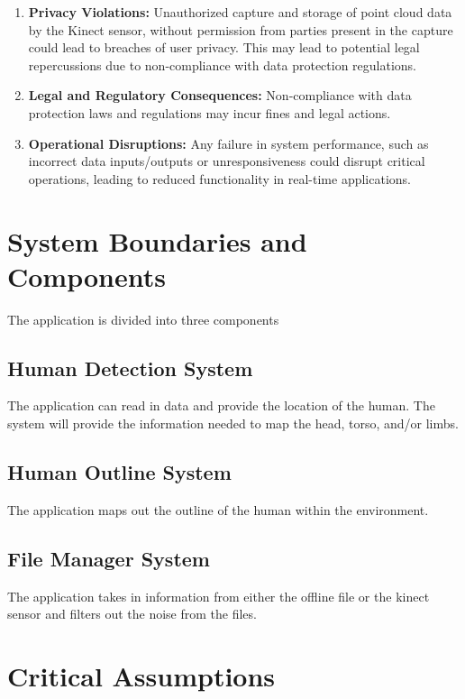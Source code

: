 \documentclass{article}
\begin{document}
\begin{enumerate}

\item \textbf{Privacy Violations:} Unauthorized capture and storage of point cloud data by the Kinect sensor, 
without permission from parties present in the capture could lead to breaches of user privacy. 
This may lead to potential legal repercussions due to non-compliance with data protection regulations.

\item \textbf{Legal and Regulatory Consequences:} Non-compliance with data protection laws and regulations may incur fines and legal actions.


\item \textbf{Operational Disruptions:} Any failure in system performance, such as incorrect data 
inputs/outputs or unresponsiveness could disrupt critical operations, leading to reduced functionality in 
real-time applications.

\end{enumerate}

\section{System Boundaries and Components}

The application is divided into three components
\subsection{Human Detection System}
The application can read in data and provide the location of the human.
The system will provide the information needed to map the head, torso, and/or limbs.
\subsection{Human Outline System}
The application maps out the outline of the human within the environment.
\subsection{File Manager System}
The application takes in information from either the offline file or the kinect sensor and filters out the noise from the files.

\section{Critical Assumptions}
\end{document}
